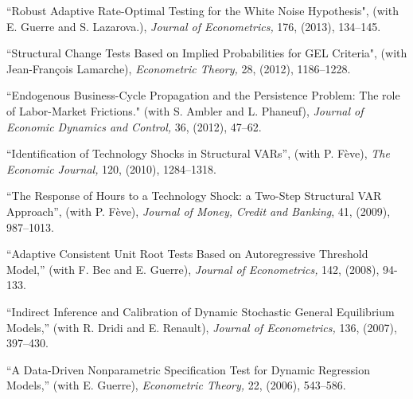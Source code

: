 \begin{description}
\item[] ``Robust Adaptive Rate-Optimal Testing for the White Noise  
Hypothesis", (with E. Guerre and S. Lazarova.),  {\it Journal of Econometrics,} 176, (2013), 134--145.



\item[] ``Structural Change Tests Based on 
Implied Probabilities for GEL Criteria", (with Jean-Fran\c{c}ois Lamarche),  {\it Econometric Theory,} 28, (2012), 1186--1228.


\item[] ``Endogenous Business-Cycle Propagation and the Persistence Problem: The role of Labor-Market Frictions."
 (with S. Ambler and L. Phaneuf), {\it Journal of Economic Dynamics and Control,}
36, (2012), 47--62.


\item[] ``Identification of Technology Shocks in Structural VARs'',  (with P. F\`eve),
{\it The Economic Journal,} 120, (2010), 1284--1318.


\item ``The Response of Hours to a Technology Shock: a Two-Step 
Structural VAR Approach'', (with P. F\`eve), 
{\it Journal of Money, Credit and Banking}, 41, (2009), 987--1013.


\item[] ``Adaptive Consistent
Unit Root Tests Based on Autoregressive Threshold  Model,'' (with F.
Bec and E. Guerre), {\it Journal of Econometrics,} 142, (2008),
94-133.


\item[] ``Indirect Inference and
Calibration of Dynamic Stochastic General Equilibrium Models,'' (with
R. Dridi and E. Renault), {\it Journal of Econometrics,} 136,
(2007), 397--430.



\item[] ``A Data-Driven Nonparametric
Specification Test for Dynamic Regression Models,'' (with E.
Guerre), {\it Econometric Theory,} 22, (2006), 543--586.



\end{description}
